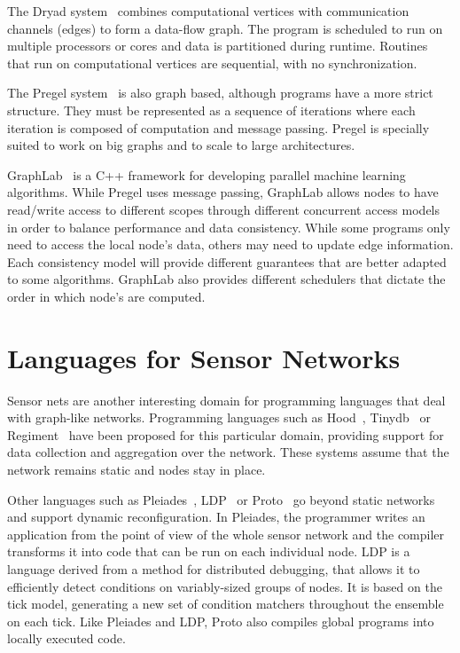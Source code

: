The Dryad system~\cite{Isard:2007:DDD:1272996.1273005} combines computational vertices
with communication channels (edges) to form a data-flow graph. The program is scheduled to
run on multiple processors or cores and data is partitioned during runtime. Routines that run on computational vertices
are sequential, with no synchronization.

The Pregel system~\cite{Malewicz:2010:PSL:1807167.1807184} is also graph based, although programs have a more strict
structure. They must be represented as a sequence of iterations where each iteration is composed of computation and message passing.
Pregel is specially suited to work on big graphs and to scale to large architectures.

GraphLab~\cite{GraphLab2010} is a C++ framework for developing parallel machine learning
algorithms. While Pregel uses message passing, GraphLab allows nodes to have read/write
access to different scopes through different concurrent access models in order to balance
performance and data consistency. While some programs only need to access the local node's
data, others may need to update edge information. Each consistency model will provide different
guarantees that are better adapted to some algorithms. GraphLab also provides different
schedulers that dictate the order in which node's are computed.

\section{Languages for Sensor Networks}

Sensor nets are another interesting domain for programming languages that deal with graph-like networks.
Programming languages such as Hood~\cite{Whitehouse:2004:HNA:990064.990079}, Tinydb~\cite{Madden:2005:TAQ:1061318.1061322}
or Regiment~\cite{Newton:2007:RMS:1236360.1236422} have been proposed for this particular domain, providing support for data collection and aggregation over the network.
These systems assume that the network remains static and nodes stay in place.

Other languages such as Pleiades~\cite{Kothari:2007:REP:1250734.1250757},
LDP~\cite{4543691} or Proto~\cite{Beal:2006:IEE:1137236.1137354} go beyond static networks and support dynamic reconfiguration. In Pleiades, the programmer writes
an application from the point of view of the whole sensor network and the compiler transforms it into code that can be run on each individual node.
LDP is a language derived from a method for distributed debugging, that allows it to efficiently detect conditions
on variably-sized groups of nodes. It is based on the tick model, generating a new set of condition matchers throughout the ensemble on each tick.
Like Pleiades and LDP, Proto also compiles global programs into locally executed code.

